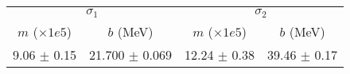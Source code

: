 \begin{tabular}{cc|cc}
\multicolumn{2}{c|}{$\sigma_1$} & \multicolumn{2}{|c}{$\sigma_2$} \\
$m$ ($\times1e5$) & $b$ (MeV) & $m$ ($\times1e5$) & $b$ (MeV) \\
\hline
9.06 $\pm$ 0.15 & 21.700 $\pm$ 0.069 & 12.24 $\pm$ 0.38 & 39.46 $\pm$ 0.17\\
\end{tabular}
